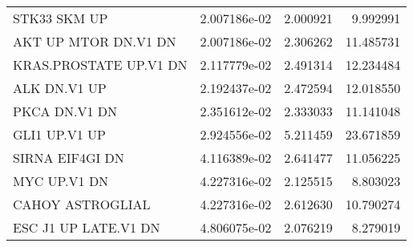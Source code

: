 \begin{tabular}{lrrr}
                      STK33 SKM UP &      2.007186e-02 &  2.000921 &        9.992991 \\
              AKT UP MTOR DN.V1 DN &      2.007186e-02 &  2.306262 &       11.485731 \\
            KRAS.PROSTATE UP.V1 DN &      2.117779e-02 &  2.491314 &       12.234484 \\
                      ALK DN.V1 UP &      2.192437e-02 &  2.472594 &       12.018550 \\
                     PKCA DN.V1 DN &      2.351612e-02 &  2.333033 &       11.141048 \\
                     GLI1 UP.V1 UP &      2.924556e-02 &  5.211459 &       23.671859 \\
                   SIRNA EIF4GI DN &      4.116389e-02 &  2.641477 &       11.056225 \\
                      MYC UP.V1 DN &      4.227316e-02 &  2.125515 &        8.803023 \\
                  CAHOY ASTROGLIAL &      4.227316e-02 &  2.612630 &       10.790274 \\
              ESC J1 UP LATE.V1 DN &      4.806075e-02 &  2.076219 &        8.279019 \\
\bottomrule
\end{tabular}
